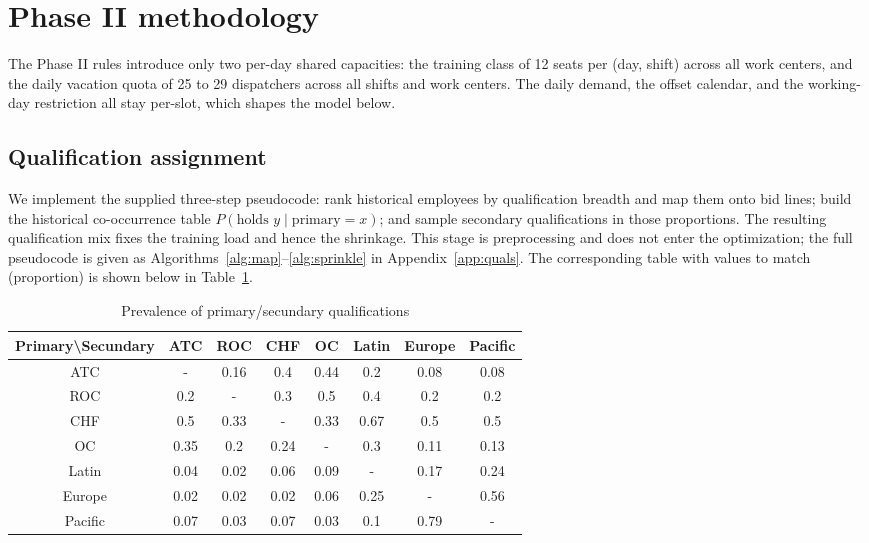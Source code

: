 \documentclass[preprint,12pt]{elsarticle}
\begin{document}
\section{Phase II methodology}
   The Phase II rules introduce only two per-day shared capacities: the training class of 12 seats per (day, shift) across all work centers, and the daily vacation quota of 25 to 29 dispatchers across all shifts and work centers. The daily demand, the offset calendar, and the working-day restriction all stay per-slot, which shapes the model below.

   \subsection{Qualification assignment}
   We implement the supplied three-step pseudocode: rank historical employees by qualification breadth and map them onto bid lines; build the historical co-occurrence table $P(\text{holds }y \mid \text{primary}=x)$; and sample secondary qualifications in those proportions. The resulting qualification mix fixes the training load and hence the shrinkage. This stage is preprocessing and does not enter the optimization; the full pseudocode is given as Algorithms~\ref{alg:map}--\ref{alg:sprinkle} in Appendix~\ref{app:quals}. The corresponding table with values to match (proportion) is shown below in Table~\ref{tab:prevalence_primary_secondary_quals}.

   \begin{table}[h!]
      \centering
      \caption{Prevalence of primary/secundary qualifications}
      \begin{tabular}{c|ccccccc}
      \toprule
      Primary\textbackslash{}Secundary & ATC   & ROC   & CHF   & OC    & Latin & Europe & Pacific \\
      \midrule
      ATC   & -     & 0.16  & 0.4   & 0.44  & 0.2   & 0.08  & 0.08 \\
      ROC   & 0.2   & -     & 0.3   & 0.5   & 0.4   & 0.2   & 0.2 \\
      CHF   & 0.5   & 0.33  & -     & 0.33  & 0.67  & 0.5   & 0.5 \\
      OC    & 0.35  & 0.2   & 0.24  & -     & 0.3   & 0.11  & 0.13 \\
      Latin & 0.04  & 0.02  & 0.06  & 0.09  & -     & 0.17  & 0.24 \\
      Europe & 0.02  & 0.02  & 0.02  & 0.06  & 0.25  & -     & 0.56 \\
      Pacific & 0.07  & 0.03  & 0.07  & 0.03  & 0.1   & 0.79  & - \\
      \bottomrule
      \end{tabular}%
      \label{tab:prevalence_primary_secondary_quals}%
   \end{table}%
\end{document}
